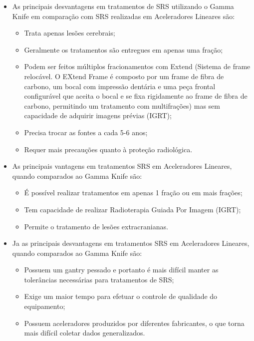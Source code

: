 \documentclass[11pt,a4paper]{article}
\newcounter{exemplo}
\begin{document}
\begin{exemplo}
\begin{itemize}
        \item As principais desvantagens em tratamentos de SRS utilizando o Gamma Knife em comparação com SRS realizadas em Aceleradores Lineares são:
        
            \begin{itemize}[label=\textcolor{CarnationPink}{$\blacktriangleright$}]
                \item Trata apenas lesões cerebrais;
                \item Geralmente os tratamentos são entregues em apenas uma fração;
                \item Podem ser feitos múltiplos fracionamentos com Extend (Sistema de frame relocável. O EXtend Frame é composto por um frame de fibra de carbono, um bocal com impressão dentária e uma peça frontal configurável que aceita o bocal e se fixa rigidamente ao frame de fibra de carbono, permitindo um tratamento com multifrações) mas sem capacidade de adquirir imagens prévias (IGRT);
                \item Precisa trocar as fontes a cada 5-6 anos;
                \item Requer mais precauções quanto à proteção radiológica.
            \end{itemize}

        \item As principais vantagens em tratamentos SRS em Aceleradores Lineares, quando comparados ao Gamma Knife são:
        
            \begin{itemize}[label=\textcolor{CarnationPink}{$\blacktriangleright$}]
                \item É possível realizar tratamentos em apenas 1 fração ou em mais frações;
                \item Tem capacidade de realizar Radioterapia Guiada Por Imagem (IGRT);
                \item Permite o tratamento de lesões extracranianas.
            \end{itemize}

        \item Ja as principais desvantagens em tratamentos SRS em Aceleradores Lineares, quando comparados ao Gamma Knife são:
            
            \begin{itemize}[label=\textcolor{CarnationPink}{$\blacktriangleright$}]
                \item Possuem um gantry pessado e portanto é mais difícil manter as tolerâncias necessárias para tratamentos de SRS;
                \item Exige um maior tempo para efetuar o controle de qualidade do equipamento;
                \item Possuem aceleradores produzidos por diferentes fabricantes, o que torna mais difícil coletar dados generalizados.
            \end{itemize}


\end{itemize}
\end{exemplo}
\end{document}
